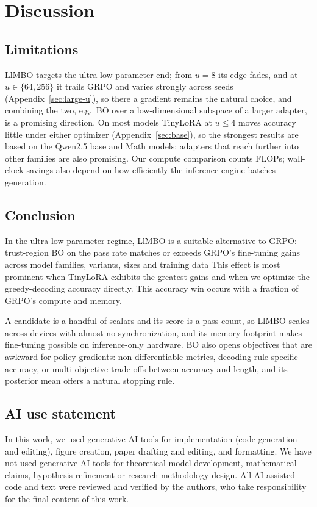 \documentclass[twoside]{article}
\newcommand{\llmbo}{LlMBO}
\begin{document}
\section{Discussion}
\label{sec:discussion}
\subsection{Limitations}
\label{sec:limitations}
\llmbo{} targets the ultra-low-parameter end; from $u = 8$ its edge fades, and at $u \in \{64, 256\}$ it trails GRPO and varies strongly across seeds (Appendix~\ref{sec:large-u}), so there a gradient remains the natural choice, and combining the two, e.g.\ BO over a low-dimensional subspace of a larger adapter, is a promising direction. On most models TinyLoRA at $u \le 4$ moves accuracy little under either optimizer (Appendix~\ref{sec:base}), so the strongest results are based on the Qwen2.5 base and Math models; adapters that reach further into other families are also promising.
Our compute comparison counts FLOPs; wall-clock savings also depend on how efficiently the inference engine batches generation.

\subsection{Conclusion}
\label{sec:conclusion}
In the ultra-low-parameter regime, \llmbo{} is a suitable alternative to GRPO: trust-region BO on the pass rate matches or exceeds GRPO's fine-tuning gains across model families, variants, sizes and training data
This effect is most prominent when TinyLoRA exhibits the greatest gains and when we optimize the greedy-decoding accuracy directly.
This accuracy win occurs with a fraction of GRPO's compute and memory.

A candidate is a handful of scalars and its score is a pass count, so \llmbo{} scales across devices with almost no synchronization, and its memory footprint makes fine-tuning possible on inference-only hardware. BO also opens objectives that are awkward for policy gradients: non-differentiable metrics, decoding-rule-specific accuracy, or multi-objective trade-offs between accuracy and length, and its posterior mean offers a natural stopping rule.

\FloatBarrier

\subsection*{AI use statement}
In this work, we used generative AI tools for implementation (code generation and editing), figure creation, paper drafting and editing, and formatting.
We have not used generative AI tools for theoretical model development, mathematical claims, hypothesis refinement or research methodology design.
All AI-assisted code and text were reviewed and verified by the authors, who take responsibility for the final content of this work.
\end{document}

